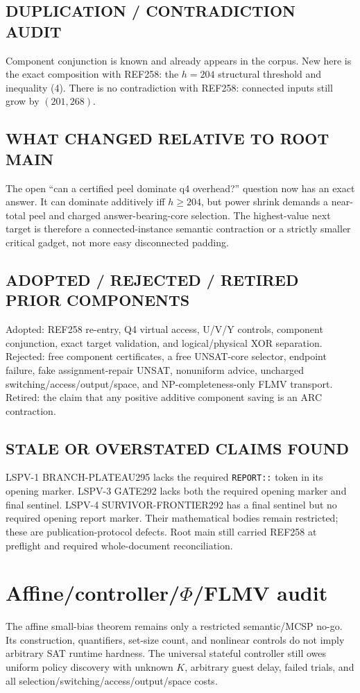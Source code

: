 \documentclass[11pt]{article}
\begin{document}
\subsection*{DUPLICATION / CONTRADICTION AUDIT}
Component conjunction is known and already appears in the corpus.  New here is the exact composition with REF258: the $h=204$ structural threshold and inequality (4).  There is no contradiction with REF258: connected inputs still grow by $(201,268)$.

\subsection*{WHAT CHANGED RELATIVE TO ROOT MAIN}
The open ``can a certified peel dominate q4 overhead?'' question now has an exact answer.  It can dominate additively iff $h\ge204$, but power shrink demands a near-total peel and charged answer-bearing-core selection.  The highest-value next target is therefore a connected-instance semantic contraction or a strictly smaller critical gadget, not more easy disconnected padding.

\subsection*{ADOPTED / REJECTED / RETIRED PRIOR COMPONENTS}
Adopted: REF258 re-entry, Q4 virtual access, U/V/Y controls, component conjunction, exact target validation, and logical/physical XOR separation.  Rejected: free component certificates, a free UNSAT-core selector, endpoint failure, fake assignment-repair UNSAT, nonuniform advice, uncharged switching/access/output/space, and NP-completeness-only FLMV transport.  Retired: the claim that any positive additive component saving is an ARC contraction.

\subsection*{STALE OR OVERSTATED CLAIMS FOUND}
LSPV-1 BRANCH-PLATEAU295 lacks the required \texttt{REPORT::} token in its opening marker.  LSPV-3 GATE292 lacks both the required opening marker and final sentinel.  LSPV-4 SURVIVOR-FRONTIER292 has a final sentinel but no required opening report marker.  Their mathematical bodies remain restricted; these are publication-protocol defects.  Root main still carried REF258 at preflight and required whole-document reconciliation.

\section{Affine/controller/$\Phi$/FLMV audit}
The affine small-bias theorem remains only a restricted semantic/MCSP no-go.  Its construction, quantifiers, set-size count, and nonlinear controls do not imply arbitrary SAT runtime hardness.  The universal stateful controller still owes uniform policy discovery with unknown $K$, arbitrary guest delay, failed trials, and all selection/switching/access/output/space costs.
\end{document}

